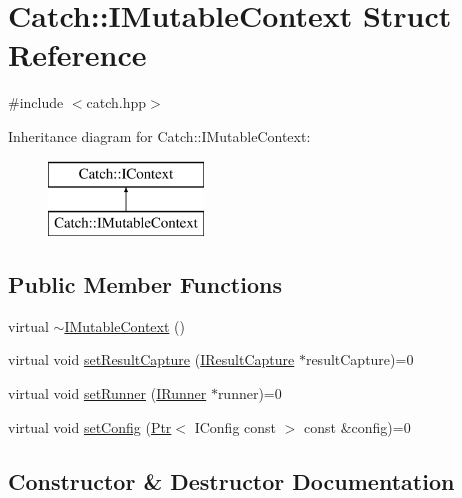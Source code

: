 \hypertarget{struct_catch_1_1_i_mutable_context}{}\section{Catch\+:\+:I\+Mutable\+Context Struct Reference}
\label{struct_catch_1_1_i_mutable_context}


{\ttfamily \#include $<$catch.\+hpp$>$}

Inheritance diagram for Catch\+:\+:I\+Mutable\+Context\+:\begin{figure}[H]
\begin{center}
\leavevmode
\includegraphics[height=2.000000cm]{struct_catch_1_1_i_mutable_context}
\end{center}
\end{figure}
\subsection*{Public Member Functions}
\begin{DoxyCompactItemize}
\item 
virtual \mbox{\hyperlink{struct_catch_1_1_i_mutable_context_a93f32b2ab6d0fb83637059240be799ab}{$\sim$\+I\+Mutable\+Context}} ()
\item 
virtual void \mbox{\hyperlink{struct_catch_1_1_i_mutable_context_a4a80afd0525b7def21bee8d9b48f2d39}{set\+Result\+Capture}} (\mbox{\hyperlink{struct_catch_1_1_i_result_capture}{I\+Result\+Capture}} $\ast$result\+Capture)=0
\item 
virtual void \mbox{\hyperlink{struct_catch_1_1_i_mutable_context_af2e53b1dea4527a2587cff266a730f6e}{set\+Runner}} (\mbox{\hyperlink{struct_catch_1_1_i_runner}{I\+Runner}} $\ast$runner)=0
\item 
virtual void \mbox{\hyperlink{struct_catch_1_1_i_mutable_context_a013e8f688a8ea7970262d07ead542a63}{set\+Config}} (\mbox{\hyperlink{class_catch_1_1_ptr}{Ptr}}$<$ I\+Config const $>$ const \&config)=0
\end{DoxyCompactItemize}


\subsection{Constructor \& Destructor Documentation}
\mbox{\label{struct_catch_1_1_i_mutable_context_a93f32b2ab6d0fb83637059240be799ab}} 
